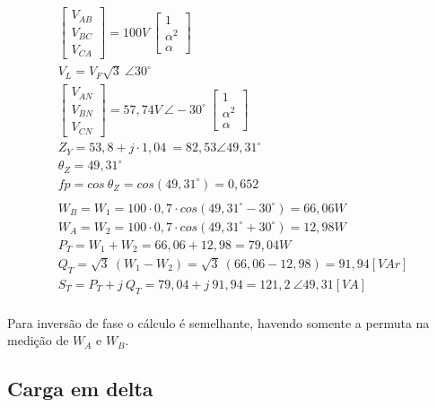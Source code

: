 \documentclass[a4paper,12pt,oneside,openany,table,xcdraw]{article}
\begin{document}
\begin{gather*}
\begin{bmatrix}
V_{AB}\\
V_{BC}\\
V_{CA}
\end{bmatrix} =100V\ \begin{bmatrix}
1\\
\alpha ^{2}\\
\alpha 
\end{bmatrix}\\
V_{L} =V_{F}\sqrt{3} \ \angle 30^{\circ }\\
\begin{bmatrix}
V_{AN}\\
V_{BN}\\
V_{CN}
\end{bmatrix} =57,74V\ \angle -30^{\circ } \ \begin{bmatrix}
1\\
\alpha ^{2}\\
\alpha 
\end{bmatrix}\\
Z_{Y} =53,8+j\cdotp 1,04\ =82,53\angle 49,31^{\circ }\\
\theta _{Z} =49,31^{\circ }\\
fp=cos\ \theta _{Z} =cos\left( 49,31^{\circ }\right) =0,652\\
\\
W_{B} =W_{1} =100\cdotp 0,7\cdotp cos\left( 49,31^{\circ } -30^{\circ }\right) =66,06W\\
W_{A} =W_{2} =100\cdotp 0,7\cdotp cos\left( 49,31^{\circ } +30^{\circ }\right) =12,98W\\
P_{T} =W_{1} +W_{2} =66,06+12,98=79,04W\\
Q_{T} =\sqrt{3} \ ( W_{1} -W_{2}) =\sqrt{3} \ ( 66,06-12,98) =91,94 [VAr]\\
S_{T} =P_{T} +j\ Q_{T} =79,04+j\ 91,94=121,2\ \angle 49,31 [VA]\\
\end{gather*}

Para inversão de fase o cálculo é semelhante, havendo somente a permuta na medição de $W_A$ e $W_B$.

\subsection{Carga em delta}
\end{document}
